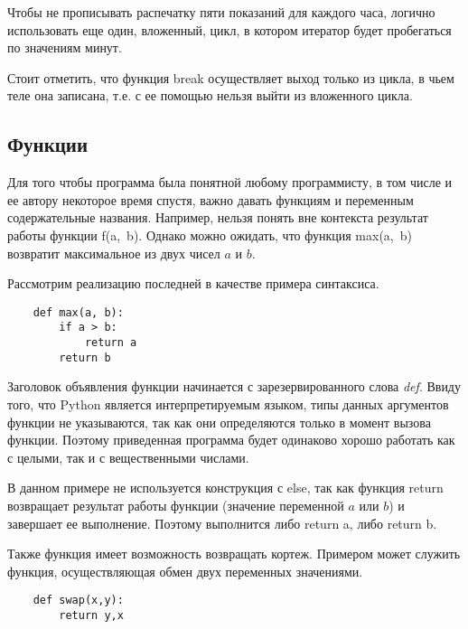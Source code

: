 \documentclass[a4paper, fleqn]{article}
\begin{document}
	Чтобы не прописывать распечатку пяти показаний для каждого часа, логично использовать еще один, вложенный, цикл, в котором итератор будет пробегаться по значениям минут.
	
	Стоит отметить, что функция break осуществляет выход только из цикла, в чьем теле она записана, т.е. с ее помощью нельзя выйти из вложенного цикла.
	
	
	\subsection*{Функции}
	
	Для того чтобы программа была понятной любому программисту, в том числе и ее автору некоторое время спустя, важно давать функциям и переменным содержательные названия. Например, нельзя понять вне контекста результат работы функции f(a,~b). Однако можно ожидать, что функция max(a,~b) возвратит максимальное из двух чисел $a$ и $b$.
	
	Рассмотрим реализацию последней в качестве примера синтаксиса.
	\begin{lstlisting}
	def max(a, b):
		if a > b:
			return a
		return b
	\end{lstlisting}
	Заголовок объявления функции начинается с зарезервированного слова \emph{def}. Ввиду того, что Python является интерпретируемым языком, типы данных аргументов функции не указываются, так как они определяются только в момент вызова функции. Поэтому приведенная программа будет одинаково хорошо работать как с целыми, так и с вещественными числами.
	
	В данном примере не используется конструкция с else, так как функция return возвращает результат работы функции (значение переменной $a$ или $b$) и завершает ее выполнение.
	Поэтому выполнится либо return a, либо return b.
	
	Также функция имеет возможность возвращать кортеж. Примером может служить функция, осуществляющая обмен двух переменных значениями.
	
	\begin{lstlisting}
	def swap(x,y):
		return y,x
	\end{lstlisting}
	
\end{document}
